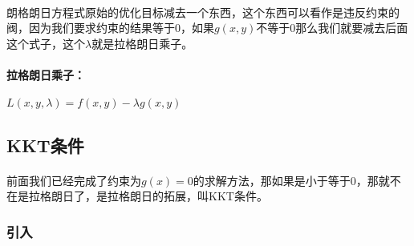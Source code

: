 			\paragraph{}朗格朗日方程式原始的优化目标减去一个东西，这个东西可以看作是违反约束的阀，因为我们要求约束的结果等于0，如果$g(x,y)$不等于0那么我们就要减去后面这个式子，这个$\lambda$就是拉格朗日乘子。
			\paragraph{拉格朗日乘子：}
			\begin{center}
				$L(x,y,\lambda) = f(x,y) - \lambda g(x,y) $
			\end{center}
		\subsection{KKT条件}
		\paragraph{}前面我们已经完成了约束为$g(x) = 0$的求解方法，那如果是小于等于0，那就不在是拉格朗日了，是拉格朗日的拓展，叫KKT条件。
		\subsubsection{引入}
